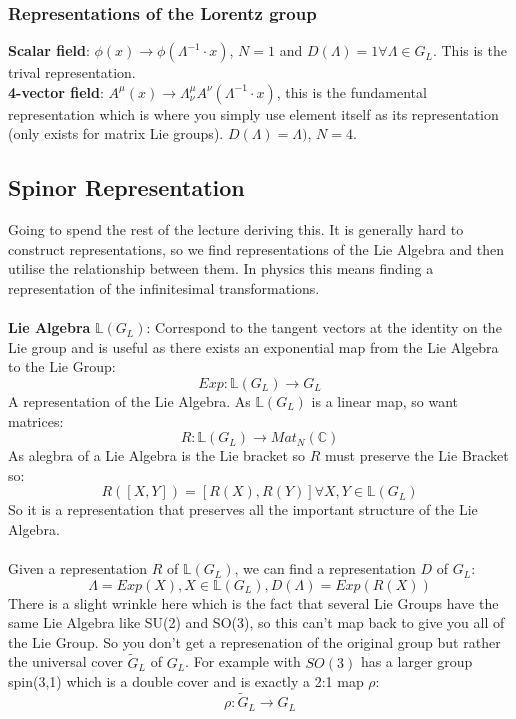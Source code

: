 \documentclass[12pt, a4paper, twoside, titlepage]{article}
\begin{document}
\subsubsection{Representations of the Lorentz group}
\textbf{Scalar field}: $\phi(x) \rightarrow \phi(\Lambda^{-1} \cdot x)$, $N=1$ and $D(\Lambda) =1 \forall \Lambda \in G_L$. This is the trival representation.\\
\textbf{4-vector field}: $A^{\mu}(x) \rightarrow \Lambda^{\mu}_{\nu}A^{\nu}(\Lambda^{-1} \cdot x)$, this is the fundamental representation which is where you simply use element itself as its representation (only exists for matrix Lie groups). $D(\Lambda) = \Lambda)$, $N=4$.\\
\subsection{Spinor Representation}
Going to spend the rest of the lecture deriving this. It is generally hard to construct representations, so we find representations of the Lie Algebra and then utilise the relationship between them. In physics this means finding a representation of the infinitesimal transformations.\\\\
\textbf{Lie Algebra} $\mathbb{L}(G_L)$: Correspond to the tangent vectors at the identity on the Lie group and is useful as there exists an exponential map from the Lie Algebra to the Lie Group:
$$
Exp: \mathbb{L}(G_L) \rightarrow G_L
$$
A representation of the Lie Algebra. As $\mathbb{L}(G_L)$ is a linear map, so want matrices:
$$
R: \mathbb{L}(G_L) \rightarrow Mat_N(\mathbb{C})
$$
As alegbra of a Lie Algebra is the Lie bracket so $R$ must preserve the Lie Bracket so:
$$
R([X,Y]) = [R(X),R(Y)] \forall X,Y \in \mathbb{L}(G_L)
$$
So it is a representation that preserves all the important structure of the Lie Algebra.\\\\
Given a representation $R$ of $\mathbb{L}(G_L)$, we can find a representation $D$ of $G_L$:
$$
\Lambda = Exp(X), X \in \mathbb{L}(G_L), D(\Lambda) = Exp(R(X))
$$
There is a slight wrinkle here which is the fact that several Lie Groups have the same Lie Algebra like SU(2) and SO(3), so this can't map back to give you all of the Lie Group. So you don't get a represenation of the original group but rather the universal cover $\tilde G_L$ of $G_L$. For example with $SO(3)$ has a larger group spin(3,1) which is a double cover and is exactly a 2:1 map $\rho$:
$$
\rho : \tilde G_L \rightarrow G_L
$$
\end{document}
